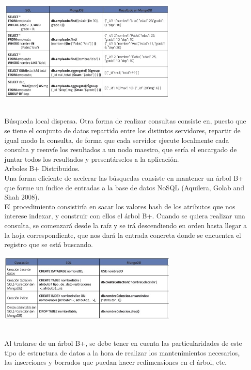 \documentclass[twoside,onecolumn]{article}
\begin{document}
\begin{flushright}
\begin{itemize}
\begin{center}
		\includegraphics[width=9cm]{./Imagenes/2}
		\end{center}	
\textbf{}\\
Búsqueda local dispersa. Otra forma de realizar consultas consiste en, puesto que se tiene el conjunto de datos repartido entre los distintos servidores, repartir de igual modo la consulta, de forma que cada servidor ejecute localmente cada consulta y reenvíe los
resultados a un nodo maestro, que sería el encargado de juntar todos los resultados y presentárselos a la aplicación.
\textbf{}\\
Arboles B+ Distribuidos.
\textbf{}\\
Una forma eficiente de acelerar las búsquedas consiste en mantener un árbol B+ que forme un índice de entradas a la base de datos NoSQL (Aquilera, Golab and Shah 2008).
\textbf{}\\
El procedimiento consistiría en sacar los valores hash de los atributos que nos interese indexar, y construir con ellos el árbol B+. Cuando se quiera realizar una consulta, se comenzará desde la raíz y se irá descendiendo en orden hasta llegar a la hoja correspondiente, que nos dará la entrada concreta donde se encuentra el registro que se está buscando.
\begin{center}
		\includegraphics[width=9cm]{./Imagenes/3}
		\end{center}	
\textbf{}\\
Al tratarse de un árbol B+, se debe tener en cuenta las particularidades de este tipo de estructura de datos a la hora de realizar los mantenimientos necesarios, las inserciones y borrados que puedan hacer redimensiones en el árbol, etc.



\end{itemize}
\end{flushright}
\end{document}
